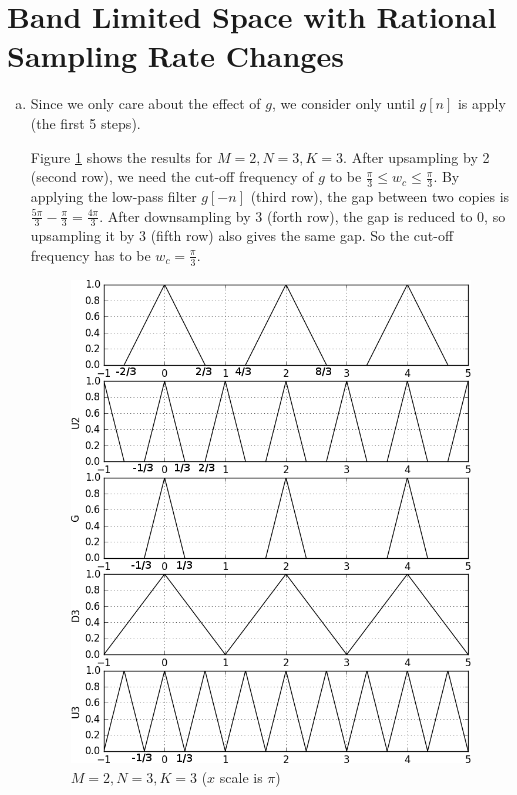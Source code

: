 \section{Band Limited Space with Rational Sampling Rate Changes}\label{sec:p2}
\begin{enumerate}[(a)]
\item Since we only care about the effect of $g$, we consider only until $g[n]$ is apply (the first 5 steps). 

Figure \ref{fig:p2-1} shows the results for $M=2, N=3, K=3$. After upsampling by 2 (second row), we need the cut-off frequency of $g$ to be $\frac{\pi}{3} \leq w_c \leq \frac{\pi}{3}$. By applying the low-pass filter $g[-n]$ (third row), the gap between two copies is $\frac{5\pi}{3} - \frac{\pi}{3} = \frac{4\pi}{3}$. After downsampling by 3 (forth row), the gap is reduced to 0, so upsampling it by 3 (fifth row) also gives the same gap. So the cut-off frequency has to be $w_c = \frac{\pi}{3}$.

\begin{figure}
	\centering
	\includegraphics[width=\textwidth]{images/p2-1}
	\caption{$M=2, N=3, K=3$ ($x$ scale is $\pi$)}
	\label{fig:p2-1}
\end{figure}


\end{enumerate}
